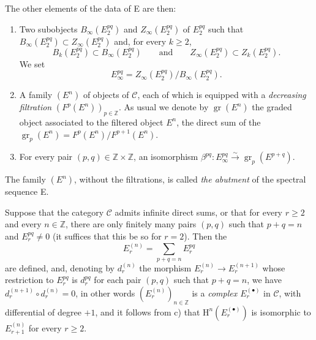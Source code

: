 \begin{env}[11.1.1]
The other elements of the data of E are then:
\begin{enumerate}
  \item[(d)] Two subobjects $B_\infty(E_2^{pq})$ and
    $Z_\infty(E_2^{pq})$ of $E_2^{pq}$ such that
    $B_\infty(E_2^{pq})\subset Z_\infty(E_2^{pq})$ and, for every $k\geq2$,
    \[
      B_k(E_2^{pq})\subset B_\infty(E_2^{pq})
      \qquad\text{and}\qquad
      Z_\infty(E_2^{pq})\subset Z_k(E_2^{pq}).
    \]
    We set
    \[
    \label{0.11.1.1.3}
      E_\infty^{pq}=Z_\infty(E_2^{pq})/B_\infty(E_2^{pq}).
      \tag{11.1.1.3}
    \]
  \item[(e)]
    A family $(E^n)$ of objects of $\mathcal C$, each of which is equipped with a
    \emph{decreasing filtration} $(F^p(E^n))_{p\in\mathbb Z}$. As usual we
    denote by $\operatorname{gr}(E^n)$ the graded object associated to the
    filtered object $E^n$, the direct sum of the
    $\operatorname{gr}_p(E^n)=F^p(E^n)/F^{p+1}(E^n)$.
  \item[(f)] For every pair $(p,q)\in\mathbb Z\times\mathbb Z$, an
    isomorphism
    $\beta^{pq}:E_\infty^{pq}\xrightarrow{\sim}
    \operatorname{gr}_p(E^{p+q})$.
\end{enumerate}

The family $(E^n)$, without the filtrations, is called \emph{the abutment}
of the spectral sequence E.

Suppose that the category $\mathcal C$ admits infinite direct sums,
or that for every $r\geq2$ and every $n\in\mathbb Z$, there are only finitely
many pairs $(p,q)$ such that $p+q=n$ and $E_r^{pq}\ne0$ (it suffices that this be
so for $r=2$). Then the
\[
  E_r^{(n)}=\sum_{p+q=n}E_r^{pq}
\]
are defined, and, denoting by $d_r^{(n)}$ the morphism
$E_r^{(n)}\to E_r^{(n+1)}$ whose restriction to $E_r^{pq}$ is $d_r^{pq}$
for each pair $(p,q)$ such that $p+q=n$, we have
$d_r^{(n+1)}\circ d_r^{(n)}=0$, in other words $(E_r^{(n)})_{n\in\mathbb Z}$
is a \emph{complex $E_r^{(\bullet)}$} in $\mathcal C$, with differential of
degree $+1$, and it follows from c) that
$\mathrm H^n(E_r^{(\bullet)})$ is isomorphic to $E_{r+1}^{(n)}$ for every
$r\geq2$.
\end{env}

